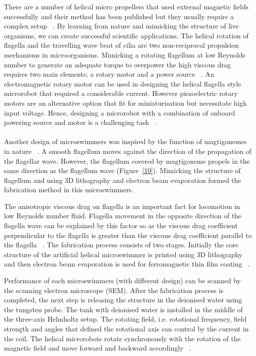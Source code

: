 \documentclass[a4paper,11pt]{article}
\begin{document}
\begin{sloppypar}
There are a number of helical micro propellers that used external magnetic fields successfully and their
 method has been published but they usually require a complex setup ~\citep{qiunanohelices}. 
By learning from nature and mimicking the structure of live organisms, we can create successful  
scientific applications. 
The helical rotation of flagella and the travelling wave beat of cilia are two non-reciprocal propulsion
 mechanisms in microorganisms. Mimicking a rotating flagellum at low Reynolds number to generate an 
adequate torque to overpower the high viscous drag requires two main elements; a rotary motor and a
 power source ~\citep{qiunanohelices}. 
An electromagnetic rotary motor can be used in designing the helical flagella style microrobot that 
required a considerable current. However piezoelectric rotary motors are an alternative option 
that fit for miniaturisation but necessitate high input voltage.  Hence, designing a microrobot with a 
combination of onboard powering source and motor is a challenging task ~\citep{qiunanohelices}.

\paragraph{}
Another design of microswimmers was inspired by the function of magtigonemes in nature ~\citep{tottori2013artificial}.
 A smooth flagellum moves against the direction of the propagation of the flagellar wave. However, 
the flagellum covered by magtigoneme propels in the same direction as the flagellum wave (Figure~\ref{10}). Mimicking 
the structure of flagellum and using 3D lithography and electron beam evaporation formed the fabrication 
method in this microswimmers.

The anisotropic viscous drag on flagella is an important fact for locomotion in low Reynolds number fluid. 
Flagella movement in the opposite direction of the flagella wave can be explained by this factor so as the 
viscous drag coefficient perpendicular to the flagella is greater than the viscous drag coefficient parallel to 
the flagella ~\citep{tottori2013artificial}. 
The fabrication process consists of two stages. Initially the core structure of the artificial helical 
microswimmer is printed using 3D lithography and then electron beam evaporation is used for 
ferromagnetic thin film coating ~\citep{tottori2013artificial}.  


Performance of each microswimmers (with different design) can be scanned by the scanning electron
 microscope (SEM). After the fabrication process is completed, the next step is releasing the structure in 
the deionised water using the tungsten probe. The tank with deionised water is installed in the middle of the 
three-axis Helmholtz setup.  The rotating field, i.e. rotational frequency, field strength and angles that 
defined the rotational axis can control by the current in the coil. The helical microrobots rotate 
synchronously with the rotation of the magnetic field and move forward and backward accordingly ~\citep{tottori2013artificial}. 


\end{sloppypar}
\end{document}
